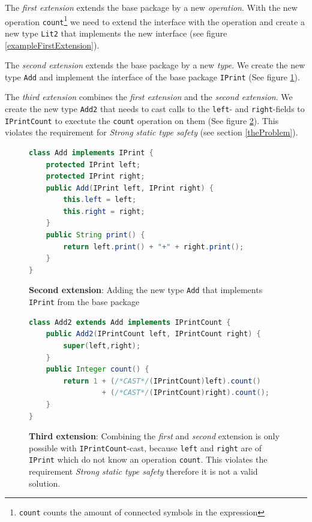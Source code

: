 \documentclass{report}
\begin{document}
The \emph{first extension} extends the base package by a new \emph{operation}. With the new operation \lstinline{count}\footnote{\lstinline{count} counts the amount of connected symbols in the expression} we need to extend the interface with the operation and create a new type \lstinline{Lit2} that implements the new interface (see figure \ref{exampleFirstExtension}).

The \emph{second extension} extends the base package by a new \emph{type}. We create the new type \lstinline{Add} and implement the interface of the base package \lstinline{IPrint} (See figure \ref{exampleSecondExtension}).

The \emph{third extension} combines the \emph{first extension} and the \emph{second extension}. We create the new type \lstinline{Add2} that needs to cast calls to the \lstinline{left}- and \lstinline{right}-fields to \lstinline{IPrintCount} to exectute the \lstinline{count} operation on them (See figure \ref{exampleThirdExtension}). This violates the requirement for \emph{Strong static type safety} (see section \ref{theProblem}).

\begin{figure}[H]
\begin{lstlisting}[language=java]
class Add implements IPrint {
    protected IPrint left;
    protected IPrint right;
    public Add(IPrint left, IPrint right) {
        this.left = left;
        this.right = right;
    }
    public String print() {
        return left.print() + "+" + right.print();
    }
}
\end{lstlisting}
\caption{\textbf{Second extension}: Adding the new type \lstinline{Add} that implements \lstinline{IPrint} from the base package}
\label{exampleSecondExtension}
\end{figure}
\begin{figure}[H]
\begin{lstlisting}[language=java,commentstyle=\color{red}]
class Add2 extends Add implements IPrintCount {
    public Add2(IPrintCount left, IPrintCount right) {
        super(left,right);
    }
    public Integer count() {
        return 1 + (/*CAST*/(IPrintCount)left).count() 
                 + (/*CAST*/(IPrintCount)right).count();
    }
}
\end{lstlisting}
\caption{\textbf{Third extension}: Combining the \emph{first} and \emph{second} extension is only possible with \lstinline{IPrintCount}-cast, because \lstinline{left} and \lstinline{right} are of \lstinline{IPrint} which do not know an operation \lstinline{count}. This violates the requirement \emph{Strong static type safety} therefore it is not a valid solution.}
\label{exampleThirdExtension}
\end{figure}
\end{document}
